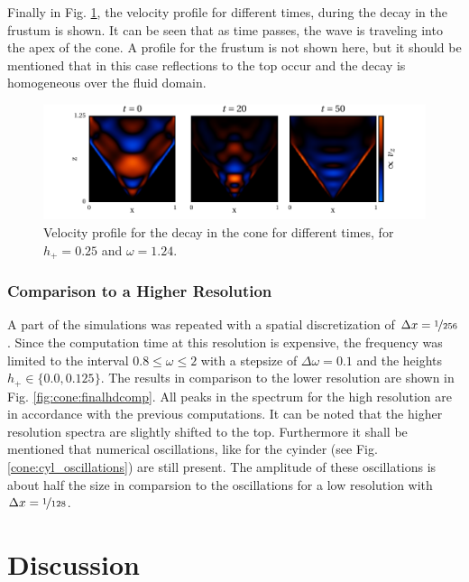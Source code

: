 Finally in Fig. \ref{fig:cone:decayphaseexample}, the velocity profile for different times, during the decay in
the frustum is shown.
It can be seen that as time passes, the wave is traveling into the apex of the cone.
A profile for the frustum is not shown here, but it should be mentioned that in this case reflections to the top occur
and the decay is homogeneous over the fluid domain.

\begin{figure}[!b]
  \centering
  \includegraphics{gfx/cone/final/decay/phase_decay.pdf}
  \caption{
      \label{fig:cone:decayphaseexample}
        Velocity profile for the decay in the cone for different times, for $h_+=0.25$ and $\omega=1.24$.
    }
\end{figure}

\subsubsection{Comparison to a Higher Resolution}

A part of the simulations was repeated with a spatial discretization of $\Delta x= \nicefrac{1}{256}$.
Since the computation time at this resolution is expensive, the frequency was limited
to the interval $0.8\leq\omega\leq2$ with a stepsize of $\Delta \omega = 0.1$ and the heights
$h_+\in\{0.0, 0.125\}$.
The results in comparison to the lower resolution are shown in Fig. \ref{fig:cone:finalhdcomp}.
All peaks in the spectrum for the high resolution are in accordance with the previous computations.
It can be noted that the higher resolution spectra are slightly shifted to the top.
Furthermore it shall be mentioned that numerical oscillations, like for the cyinder
(see Fig. \ref{cone:cyl_oscillations}) are still present.
The amplitude of these oscillations is about half the size in comparsion to the oscillations for
a low resolution with $\Delta x = \nicefrac{1}{128}$.

\clearpage

\section{Discussion}
